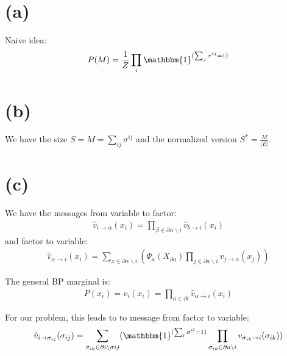 \documentclass[a4paper]{scrartcl}
\begin{document}
\section*{(a)}

Naive idea:
\begin{align}
    P(M) = \frac{1}{Z}\prod_i \mathbbm{1}^{(\sum_j \sigma^{ij} = 1)}
\end{align}

\section*{(b)}
We have the size $S = M=\sum_{ij} \sigma^{ij}$ and the normalized version $S^*=\frac{M}{\lvert E \rvert}$.

\section*{(c)}
We have the messages from variable to factor:
\begin{align}
    \hat{v}_{i \rightarrow \alpha}(x_i) = \prod_{\beta \in \partial \alpha \backslash i} \hat{v}_{b \rightarrow i}(x_i)
\end{align}
and factor to variable:
\begin{align}
    \hat{v}_{\alpha \rightarrow i}(x_i) = \sum_{x \in \partial \alpha \backslash i} (\Psi_a(X_{\partial a}) \prod_{j \in \partial a \backslash i} v_{j \rightarrow a}(x_j))
\end{align}

The general BP marginal is:
\begin{align}
    P(x_i) = v_i(x_i) = \prod_{a \in \partial i} \hat{v}_{\alpha \rightarrow i}(x_i)
\end{align}

For our problem, this leads to to message from factor to variable:
\begin{align}
    \hat{v}_{i \rightarrow \sigma_{ij}}(\sigma_{ij}) &= \sum_{\sigma_{ik} \in \partial i \backslash \sigma{ij}} (\mathbbm{1}^{(\sum_l \sigma^{il} = 1)} \prod_{\sigma_{ik} \in \partial a \backslash i} v_{\sigma_{ik} \rightarrow i}(\sigma_{ik}))\\
\end{align}
\end{document}
